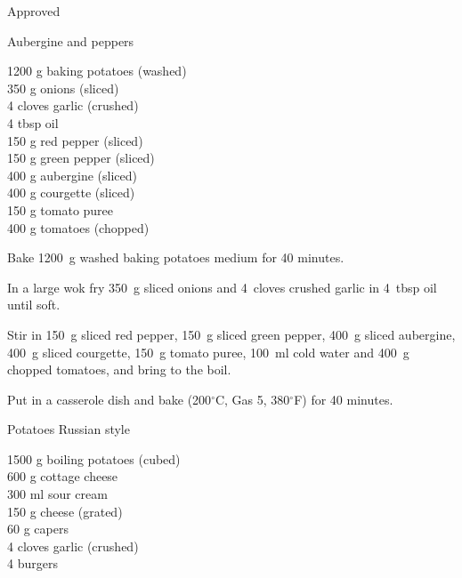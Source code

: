 \begin{menu}{Approved}
    \begin{recipe}{2}{Aubergine and peppers}%
    
		\begin{ingredients}
		1200 g baking potatoes (washed) \\
	350 g onions (sliced) \\
	4 cloves garlic (crushed) \\
	4 tbsp oil  \\
	150 g red pepper (sliced) \\
	150 g green pepper (sliced) \\
	400 g aubergine (sliced) \\
	400 g courgette (sliced) \\
	150 g tomato puree  \\
	400 g tomatoes (chopped) \\
	
		\end{ingredients}
	
    \begin{instructions}
    \item 
      Bake 1200~g washed baking potatoes
      medium for 40 minutes.
    \item 
        In a large wok fry
        350~g sliced onions
        and
        4~cloves crushed garlic
        in
        4~tbsp  oil
        until soft.
      \item 
        Stir in
        150~g sliced red pepper,
        150~g sliced green pepper,
        400~g sliced aubergine,
        400~g sliced courgette,
        150~g  tomato puree,
        100~ml  cold water
        and
        400~g chopped tomatoes,
        and bring to the boil.
      \item 
        Put in a casserole dish and bake 
      (200$^{\circ}$C, Gas 5, 380$^{\circ}$F)
     for 40 minutes.
      
    \end{instructions}
    \end{recipe}%
  
    \begin{recipe}{2}{Potatoes Russian style}%
    
		\begin{ingredients}
		1500 g boiling potatoes (cubed) \\
	600 g cottage cheese  \\
	300 ml sour cream  \\
	150 g cheese (grated) \\
	60 g capers  \\
	4 cloves garlic (crushed) \\
	4  burgers  \\
	

\end{ingredients}
\end{recipe}
\end{menu}
